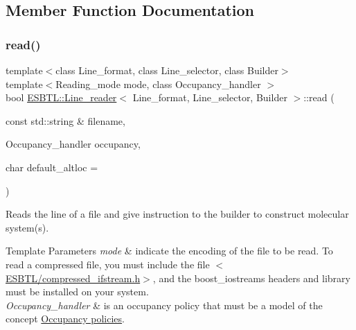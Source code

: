 \subsection{Member Function Documentation}
\mbox{\label{classESBTL_1_1Line__reader_aaf4f352f79c0bc1fc2afb52afd4f751f}} 
\subsubsection{\texorpdfstring{read()}{read()}\hspace{0.1cm}{\footnotesize\ttfamily [1/2]}}
{\footnotesize\ttfamily template$<$class Line\+\_\+format, class Line\+\_\+selector, class Builder$>$ \\
template$<$Reading\+\_\+mode mode, class Occupancy\+\_\+handler $>$ \\
bool \hyperlink{classESBTL_1_1Line__reader}{E\+S\+B\+T\+L\+::\+Line\+\_\+reader}$<$ Line\+\_\+format, Line\+\_\+selector, Builder $>$\+::read (\begin{DoxyParamCaption}\item[{const std\+::string \&}]{filename,  }\item[{Occupancy\+\_\+handler}]{occupancy,  }\item[{char}]{default\+\_\+altloc = {\ttfamily \textquotesingle{}~\textquotesingle{}} }\end{DoxyParamCaption})\hspace{0.3cm}{\ttfamily [inline]}}

Reads the line of a file and give instruction to the builder to construct molecular system(s). 
\begin{DoxyTemplParams}{Template Parameters}
{\em mode} & indicate the encoding of the file to be read. To read a compressed file, you must include the file $<$\hyperlink{compressed__ifstream_8h}{E\+S\+B\+T\+L/compressed\+\_\+ifstream.\+h}$>$, and the boost\+\_\+iostreams headers and library must be installed on your system. \\
\hline
{\em Occupancy\+\_\+handler} & is an occupancy policy that must be a model of the concept \hyperlink{group__occpol}{Occupancy policies}. \\
\hline
\end{DoxyTemplParams}

